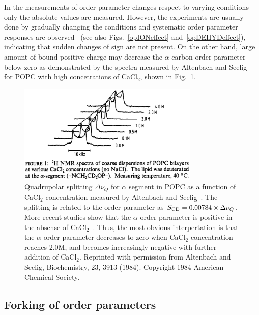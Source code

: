 \documentclass[aps,prl,superscriptaddress,twocolumn]{revtex4}
\begin{document}
In the measurements of order parameter changes respect to varying 
conditions~\cite{seelig74,seelig77,bechinger91,ulrich94,mallikarjunaiah11,dvinskikh05a,akutsu81,altenbach84,seelig87,scherer89,brown78,douliez95,ferreira13,leftin14,kuchinka89,roux90,leftin13} 
only the absolute values are measured. However, the experiments are usually done by gradually changing the conditions and systematic 
order parameter responses are observed~\cite{akutsu81,altenbach84,bechinger91,ulrich94,dvinskikh05b,mallikarjunaiah11,ferreira13} 
(see also Figs.~\ref{opIONeffect} and~\ref{opDEHYDeffect}), indicating that sudden changes of sign are not present. 
On the other hand, large amount of bound positive charge may decrease the $\alpha$ carbon order parameter below zero
as demonstrated by the spectra measured by Altenbach and Seelig~\cite{altenbach84} for POPC with high concetrations of CaCl$_2$,
shown in Fig.~\ref{qsCACLeffect}.
\begin{figure}[]
  \includegraphics[width=8.6cm]{../Fig/QUADsplitCACLeffect.eps}
\newline
  \caption{\label{qsCACLeffect}
    Quadrupolar splitting $\Delta \nu_Q$ for $\alpha$ segment in POPC as a function of CaCl$_2$ concentration measured by Altenbach and Seelig~\cite{altenbach84}.
    The splitting is related to the order parameter as $S_{{\rm CD}}=0.00784 \times \Delta \nu_Q$. 
    More recent studies show that the $\alpha$ order parameter is positive in the absense of CaCl$_2$~\cite{hong95a,hong95b,gross97}.
    Thus, the most obvious interpertation is that the $\alpha$ order parameter decreases to zero when CaCl$_2$ concentration reaches 2.0M, and 
    becomes increasingly negative with further addition of CaCl$_2$. Reprinted with permission from Altenbach and Seelig, Biochemistry, 23, 3913 (1984). Copyright 1984 American Chemical Society.    
  } 
\end{figure}



\subsection{Forking of order parameters}
\end{document}
